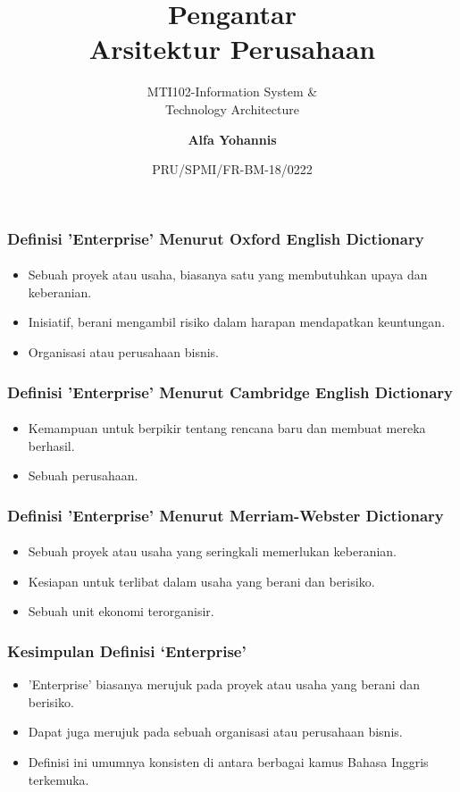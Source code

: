 \documentclass[aspectratio=169, table]{beamer}
\subtitle{MTI102-Information System \&\\Technology Architecture}
\title{\Large Pengantar\\Arsitektur Perusahaan}
\date[Serial]{\scriptsize {PRU/SPMI/FR-BM-18/0222}}
\author[Pradita]{\small {\textbf{Alfa Yohannis}}}
\begin{document}
	\frame{\titlepage}

	\begin{frame}
		\frametitle{Definisi 'Enterprise' Menurut Oxford English Dictionary}
        \framesubtitle{\hspace{1cm}}
		\begin{itemize}
			\item Sebuah proyek atau usaha, biasanya satu yang membutuhkan upaya dan keberanian.
			\item Inisiatif, berani mengambil risiko dalam harapan mendapatkan keuntungan.
			\item Organisasi atau perusahaan bisnis.
		\end{itemize}
	\end{frame}

	\begin{frame}
		\frametitle{Definisi 'Enterprise' Menurut Cambridge English Dictionary}
        \framesubtitle{\hspace{1cm}}
		\begin{itemize}
			\item Kemampuan untuk berpikir tentang rencana baru dan membuat mereka berhasil.
			\item Sebuah perusahaan.
		\end{itemize}
	\end{frame}

	\begin{frame}
		\frametitle{Definisi 'Enterprise' Menurut Merriam-Webster Dictionary}
        \framesubtitle{\hspace{1cm}}
		\begin{itemize}
			\item Sebuah proyek atau usaha yang seringkali memerlukan keberanian.
			\item Kesiapan untuk terlibat dalam usaha yang berani dan berisiko.
			\item Sebuah unit ekonomi terorganisir.
		\end{itemize}
	\end{frame}

	\begin{frame}
		\frametitle{Kesimpulan Definisi `Enterprise'}
		\begin{itemize}
			\item 'Enterprise' biasanya merujuk pada proyek atau usaha yang berani dan berisiko.
			\item Dapat juga merujuk pada sebuah organisasi atau perusahaan bisnis.
			\item Definisi ini umumnya konsisten di antara berbagai kamus Bahasa Inggris terkemuka.
		\end{itemize}
	\end{frame}
\end{document}
